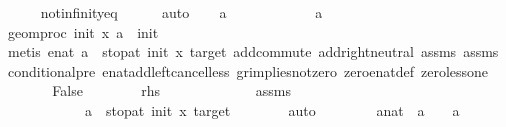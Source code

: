 \begin{isabellebody}
\ \ \ \ \isamarkupfalse%
\ not{\isacharunderscore}{\kern0pt}infinity{\isacharunderscore}{\kern0pt}eq\isanewline
\ \ \ \ \isamarkupfalse%
\ auto\isanewline
\ \ \isamarkupfalse%
\ {\isachardoublequoteopen}a{\isacharprime}{\kern0pt}\ {\isasymnoteq}\ {}{\isachardoublequoteclose}\isanewline
\ \ \isamarkupfalse%
\ \isanewline
\ \ \ \ \isamarkupfalse%
\ {\isachardoublequoteopen}a{\isacharprime}{\kern0pt}\ {\isacharequal}{\kern0pt}\ {}{\isachardoublequoteclose}\isanewline
\ \ \ \ \isamarkupfalse%
\ \isamarkupfalse%
\ {\isachardoublequoteopen}geom{\isacharunderscore}{\kern0pt}proc\ init\ x\ a{\isacharprime}{\kern0pt}\ {\isacharequal}{\kern0pt}\ init{\isachardoublequoteclose}\isanewline
\ \ \ \ \ \ \isamarkupfalse%
\ {\isacharparenleft}{\kern0pt}metis\ {\isacartoucheopen}enat\ a{\isacharprime}{\kern0pt}\ {\isacharequal}{\kern0pt}\ stop{\isacharunderscore}{\kern0pt}at\ init\ x\ target{\isacartoucheclose}\ add{\isachardot}{\kern0pt}commute\ add{\isachardot}{\kern0pt}right{\isacharunderscore}{\kern0pt}neutral\ assms{\isacharparenleft}{\kern0pt}{}{\isacharparenright}{\kern0pt}\ assms{\isacharparenleft}{\kern0pt}{}{\isacharparenright}{\kern0pt}\ conditional{}{\isacharunderscore}{\kern0pt}pre\ enat{\isacharunderscore}{\kern0pt}add{\isacharunderscore}{\kern0pt}left{\isacharunderscore}{\kern0pt}cancel{\isacharunderscore}{\kern0pt}less\ gr{\isacharunderscore}{\kern0pt}implies{\isacharunderscore}{\kern0pt}not{\isacharunderscore}{\kern0pt}zero\ zero{\isacharunderscore}{\kern0pt}enat{\isacharunderscore}{\kern0pt}def\ zero{\isacharunderscore}{\kern0pt}less{\isacharunderscore}{\kern0pt}one{\isacharparenright}{\kern0pt}\isanewline
\ \ \ \ \isamarkupfalse%
\ \isamarkupfalse%
\ False\isanewline
\ \ \ \ \ \ \isamarkupfalse%
\ rhs{}\ \isanewline
\ \ \ \ \ \ \ \ \ \ \ \ assms\isanewline
\ \ \ \ \ \ \ \ \ \ \ \ {\isacartoucheopen}a{\isacharprime}{\kern0pt}\ {\isacharequal}{\kern0pt}\ stop{\isacharunderscore}{\kern0pt}at\ init\ x\ target{\isacartoucheclose}\isanewline
\ \ \ \ \ \ \isamarkupfalse%
\ auto\isanewline
\ \ \isamarkupfalse%
\isanewline
\ \ \isamarkupfalse%
\ \isamarkupfalse%
\ a{\isacharcolon}{\kern0pt}{\isacharcolon}{\kern0pt}nat\ \ {\isachardoublequoteopen}a\ {\isacharplus}{\kern0pt}\ {}\ {\isacharequal}{\kern0pt}\ a{\isacharprime}{\kern0pt}{\isachardoublequoteclose}\isanewline

\end{isabellebody}
